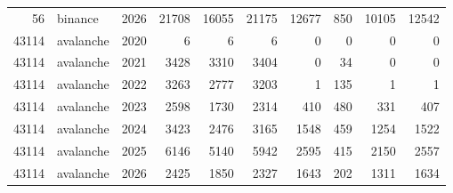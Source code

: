 \begin{table}
\begin{tabular}{rlrrrrrrrr}
56 & binance & 2026 & 21708 & 16055 & 21175 & 12677 & 850 & 10105 & 12542 \\
43114 & avalanche & 2020 & 6 & 6 & 6 & 0 & 0 & 0 & 0 \\
43114 & avalanche & 2021 & 3428 & 3310 & 3404 & 0 & 34 & 0 & 0 \\
43114 & avalanche & 2022 & 3263 & 2777 & 3203 & 1 & 135 & 1 & 1 \\
43114 & avalanche & 2023 & 2598 & 1730 & 2314 & 410 & 480 & 331 & 407 \\
43114 & avalanche & 2024 & 3423 & 2476 & 3165 & 1548 & 459 & 1254 & 1522 \\
43114 & avalanche & 2025 & 6146 & 5140 & 5942 & 2595 & 415 & 2150 & 2557 \\
43114 & avalanche & 2026 & 2425 & 1850 & 2327 & 1643 & 202 & 1311 & 1634 \\
\bottomrule
\end{tabular}
\end{table}
